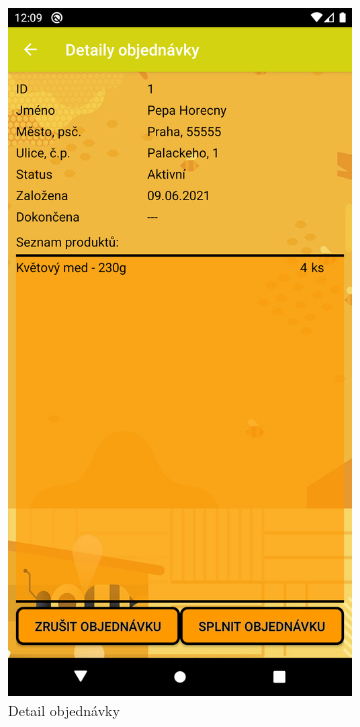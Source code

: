 \documentclass[12pt]{report}
\begin{document}
\begin{figure}[H]
\begin{subfigure}{.45\textwidth}
	  \includegraphics[width=\textwidth]{img/order_detail.png}
	  \caption{Detail objednávky}
	  \label{fig:order_det}
	\end{subfigure}
	\begin{subfigure}{.45\textwidth}

\end{subfigure}
\end{figure}
\end{document}
